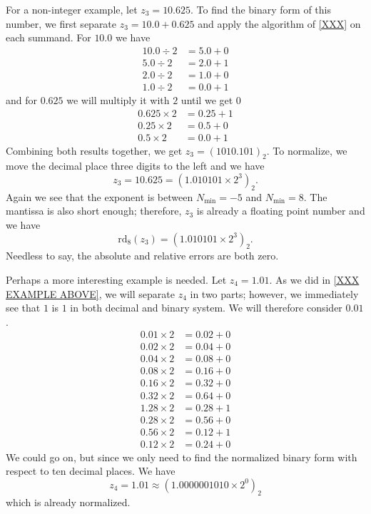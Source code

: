 \begin{exmp}
    For a non-integer example, let \(z_3 = 10.625\). To find the binary form of this number, we first separate \(z_3 = 10.0 + 0.625\) and apply the algorithm of \ref{XXX} on each summand. For \(10.0\) we have
    \begin{align*}
        10.0 \div 2 &= 5.0 + 0 \\
        5.0 \div 2 &= 2.0 + 1 \\
        2.0 \div 2 &= 1.0 + 0 \\
        1.0 \div 2 &= 0.0 + 1
    \end{align*}
    and for \(0.625\) we will multiply it with \(2\) until we get \(0\)
    \begin{align*}
        0.625 \times 2 &= 0.25 + 1 \\
        0.25 \times 2 &= 0.5 + 0 \\
        0.5 \times 2 &= 0.0 + 1
    \end{align*}
    Combining both results together, we get \(z_3 = (1010.101)_2\). To normalize, we move the decimal place three digits to the left and we have
    \begin{equation*}
        z_3 = 10.625 = (1.010101 \times 2^3)_2 \text{.}
    \end{equation*}
    Again we see that the exponent is between \(N_{\text{min}} = -5\) and \(N_{\text{min}} = 8\). The mantissa is also short enough; therefore, \(z_3\) is already a floating point number and we have
    \begin{equation*}
        \text{rd}_8(z_3) = (1.010101 \times 2^3)_2 \text{.}
    \end{equation*}
    Needless to say, the absolute and relative errors are both zero.
\end{exmp}
%
%
\begin{exmp}
    Perhaps a more interesting example is needed. Let \(z_4 = 1.01\). As we did in \ref{XXX EXAMPLE ABOVE}, we will separate \(z_4\) in two parts; however, we immediately see that \(1\) is \(1\) in both decimal and binary system. We will therefore consider \(0.01\).
    \begin{align*}
        0.01 \times 2 &= 0.02 + 0 \\
        0.02 \times 2 &= 0.04 + 0 \\
        0.04 \times 2 &= 0.08 + 0 \\
        0.08 \times 2 &= 0.16 + 0 \\
        0.16 \times 2 &= 0.32 + 0 \\
        0.32 \times 2 &= 0.64 + 0 \\
        1.28 \times 2 &= 0.28 + 1 \\
        0.28 \times 2 &= 0.56 + 0 \\
        0.56 \times 2 &= 0.12 + 1 \\
        0.12 \times 2 &= 0.24 + 0
    \end{align*}
    We could go on, but since we only need to find the normalized binary form with respect to ten decimal places. We have
    \begin{equation*}
        z_4 = 1.01 \approx (1.0000001010 \times 2^0)_2
    \end{equation*}
    which is already normalized.
\end{exmp}
